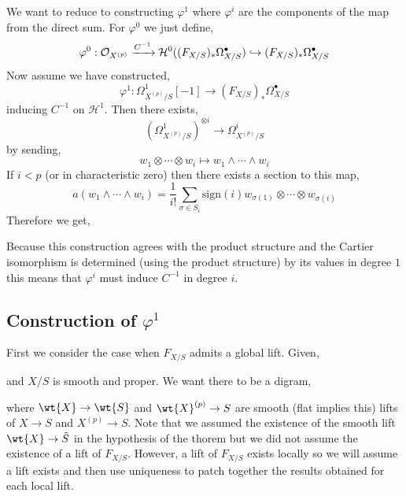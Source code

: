 \documentclass[12pt]{article}
\newcommand{\LL}{\mathbb{L}}
\begin{document}
We want to reduce to constructing $\varphi^1$ where $\varphi^i$ are the components of the map from the direct sum. For $\varphi^0$ we just define,
\[ \varphi^0 : \mathcal{O}_{X^{(p)}} \xrightarrow{C^{-1}} \mathcal{H}^0((F_{X/S})_* \Omega^\bullet_{X/S}) \hookrightarrow (F_{X/S})_* \Omega^\bullet_{X/S} \]
Now assume we have constructed,
\[ \varphi^1 : \Omega^1_{X^{(p)}/S} [-1] \to (F_{X/S})_* \Omega^\bullet_{X/S} \]
inducing $C^{-1}$ on $\mathcal{H}^1$.
Then there exists,
\[ \left( \Omega^1_{X^{(p)}/S} \right)^{\otimes i} \to \Omega^i_{X^{(p)}/S} \]
by sending,
\[ w_1 \otimes \cdots \otimes w_i \mapsto w_1 \wedge \cdots \wedge w_i \]
If $i < p$ (or in characteristic zero) then there exists a section to this map,
\[ a(w_1 \wedge \cdots \wedge w_i)  = \frac{1}{i!} \sum_{\sigma \in S_i} \mathrm{sign}(i) w_{\sigma(1)} \otimes \cdots \otimes w_{\sigma(i)} \]
Therefore we get,
\begin{center}
\end{center}
Because this construction agrees with the product structure and the Cartier isomorphism is determined (using the product structure) by its values in degree $1$ this means that $\varphi^i$ must induce $C^{-1}$ in degree $i$.

\subsection{Construction of $\varphi^1$}

First we consider the case when $F_{X/S}$ admits a global lift. Given,
\begin{center}
\end{center}
and $X/S$ is smooth and proper. We want there to be a digram,
\begin{center}
\end{center}
where $\wt{X} \to \wt{S}$ and $\wt{X}^{(p)} \to S$ are smooth (flat implies this) lifts of $X \to S$ and $X^{(p)} \to S$. Note that we assumed the existence of the smooth lift $\wt{X} \to \tilde{S}$ in the hypothesis of the thorem but we did not assume the existence of a lift of $F_{X/S}$. However, a lift of $F_{X/S}$ exists locally so we will assume a lift exists and then use uniqueness to patch together the results obtained for each local lift. 
\end{document}
